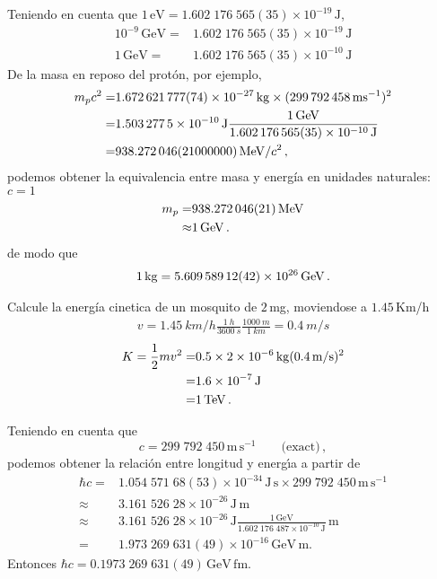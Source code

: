 \begin{frame}
Teniendo en cuenta que $1\,\text{eV}=1.602\;176\;565(35)\times10^{-19}\,\text{J}$,
\begin{align}
  10^{-9}\,\text{GeV}=&1.602\;176\;565(35)\times10^{-19}\,\text{J}\nonumber\\
  1\,\text{GeV}=&1.602\;176\;565(35)\times10^{-10}\,\text{J}
\end{align}
De la masa en reposo del protón, por ejemplo, 
\begin{align*}
  m_pc^2=&\SI{1.672621777 +- 0.000000074E-27}{kg}\times (\SI{299792458}{ms^{-1}})^2\nonumber\\
  =&\SI{1.5032775e-10}{J}\frac{\SI{1}{GeV}}{\SI{1.602176565 +- .000000035E-10}{J}}\nonumber\\
  =&\SI{938.272046+-21}{MeV}/c^2\,,
\end{align*}
podemos obtener la equivalencia entre masa y energía en unidades naturales: $c=1$
\begin{align}
m_p=&\SI{938.272046+-0.000021}{MeV}\nonumber\\
  \approx& \SI{1}{GeV}\,.
\end{align}
de modo que
\begin{align}
  \SI{1}{kg}=\SI{5.60958912 +- 0.00000042E26}{GeV}\,.
\end{align}

\begin{example}
  Calcule la energía cinetica de un mosquito de $2\,$mg, moviendose a $1.45\,$Km/h
  \begin{align}
    v= \SI{1.45}{km/h}\frac{\SI{1}{h}}{\SI{3600}{s}}\frac{\SI{1000}{m}}{\SI{1}{km}}=\SI{0.4}{m/s}  
\end{align}
\begin{align}
  K=\frac{1}{2}mv^2=&0.5\times \SI{2E-6}{kg}(\SI{0.4}{m/s})^2 \nonumber\\
                   =&\SI{1.6E-7}{J}\nonumber\\
                   =&\SI{1}{TeV}\,.
\end{align}

\end{example}

Teniendo en cuenta que \cite{PDG}
\begin{equation}
    c=299\;792\;450\,\text{m}\,\text{s}^{-1}\qquad\text{(exact)}\,,
\end{equation}
podemos obtener la relaci\'on entre longitud y energ\'\i a a partir de
\begin{align}
  \hbar c=&1.054\;571\;68(53)\times10^{-34}\,\text{J}\,\text{s}\times299\;792\;450\,\text{m}\,\text{s}^{-1} \nonumber\\
  \approx&3.161\;526\;28\times10^{-26}\,\text{J}\,\text{m}\nonumber\\
  \approx&3.161\;526\;28\times10^{-26}\,{\text{J}}\frac{1\,\text{GeV}}{1.602\;176\;487\times10^{-10}\,\text{J}}\,\text{m}\nonumber\\
  =&1.973\;269\;631(49)\times10^{-16}\,\text{GeV}\,\text{m}.
\end{align}
Entonces $\hbar c =0.1973\;269\;631(49)\,\text{GeV}\,\text{fm}$.


\end{frame}
